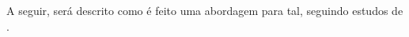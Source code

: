          A seguir, será descrito como é feito uma abordagem para tal, seguindo estudos de \citet{Arato2003, Wang2016}.

